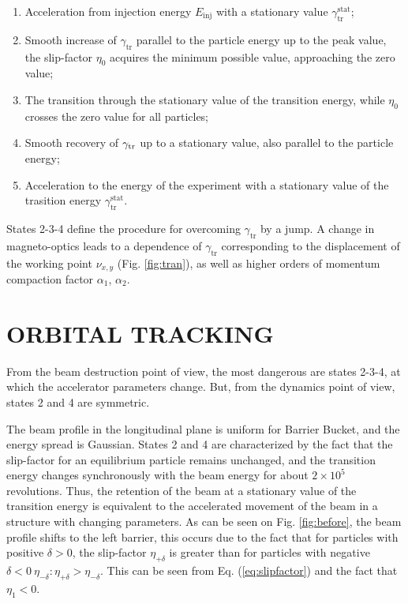 \documentclass[
aps,%
12pt,%
final,%
notitlepage,%
oneside,%
onecolumn,%
nobibnotes,%
nofootinbib,%
superscriptaddress,%
noshowpacs,%
centertags]%
{revtex4}
\begin{document}
\begin{enumerate} 
  \item Acceleration from injection energy $E_{\text{inj}}$ with a stationary value $\gamma_{\text{tr}}^{\text{stat}}$;
  \item Smooth increase of $\gamma_{\text{tr}}$ parallel to the particle energy up to the peak value, the slip-factor $\eta_0$ acquires the minimum possible value, approaching the zero value;
  \item The transition through the stationary value of the transition energy, while $\eta_0$ crosses the zero value for all particles;
  \item Smooth recovery of $\gamma_{\text{\text{tr}}}$ up to a stationary value, also parallel to the particle energy;
  \item Acceleration to the energy of the experiment with a stationary value of the trasition energy $\gamma_{\text{tr}}^{\text{stat}}$.
  \end{enumerate}

\par States 2-3-4 define the procedure for overcoming $\gamma_{\text{tr}}$ by a jump. A change in magneto-optics leads to a dependence of $\gamma_{\text{tr}}$ corresponding to the displacement of the working point $\nu_{x,y}$ (Fig. \ref{fig:tran}), as well as higher orders of momentum compaction factor $\alpha_1$, $\alpha_2$.

\section{ORBITAL TRACKING}

\par From the beam destruction point of view, the most dangerous are states 2-3-4, at which the accelerator parameters change. But, from the dynamics point of view, states 2 and 4 are symmetric.

\par The beam profile in the longitudinal plane is uniform for Barrier Bucket, and the energy spread is Gaussian. States 2 and 4 are characterized by the fact that the slip-factor for an equilibrium particle remains unchanged, and the transition energy changes synchronously with the beam energy for about $2\times{10}^5$ revolutions. Thus, the retention of the beam at a stationary value of the transition energy is equivalent to the accelerated movement of the beam in a structure with changing parameters. As can be seen on Fig. \ref{fig:before}, the beam profile shifts to the left barrier, this occurs due to the fact that for particles with positive $\delta>0$, the slip-factor $\eta_{+\delta}$ is greater than for particles with negative $\delta<0\ \eta_{-\delta}: \eta_{+\delta}>\eta_{-\delta}$. This can be seen from Eq. (\ref{eq:slipfactor}) and the fact that $\eta_1<0$.
\end{document}
